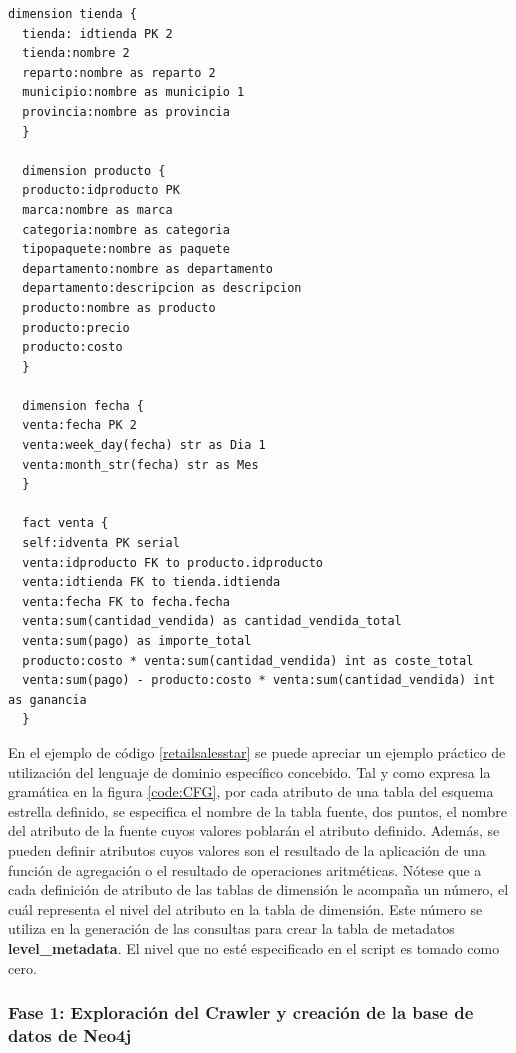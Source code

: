 \begin{lstlisting}[label={retailsalesstar}, caption={Definici\'on del esquema estrella del almacén de datos asociado al escenario ventas minoristas}]
  dimension tienda {
  tienda: idtienda PK 2
  tienda:nombre 2
  reparto:nombre as reparto 2
  municipio:nombre as municipio 1
  provincia:nombre as provincia 
  }

  dimension producto {
  producto:idproducto PK
  marca:nombre as marca
  categoria:nombre as categoria
  tipopaquete:nombre as paquete
  departamento:nombre as departamento
  departamento:descripcion as descripcion
  producto:nombre as producto
  producto:precio
  producto:costo
  }

  dimension fecha {
  venta:fecha PK 2
  venta:week_day(fecha) str as Dia 1
  venta:month_str(fecha) str as Mes 
  }

  fact venta {
  self:idventa PK serial
  venta:idproducto FK to producto.idproducto 
  venta:idtienda FK to tienda.idtienda
  venta:fecha FK to fecha.fecha
  venta:sum(cantidad_vendida) as cantidad_vendida_total
  venta:sum(pago) as importe_total
  producto:costo * venta:sum(cantidad_vendida) int as coste_total
  venta:sum(pago) - producto:costo * venta:sum(cantidad_vendida) int as ganancia 
  }
\end{lstlisting}

En el ejemplo de c\'odigo \ref{retailsalesstar} se puede apreciar un ejemplo pr\'actico de utilización 
del lenguaje de dominio espec\'ifico concebido. Tal y como expresa la gramática en la figura \ref{code:CFG}, 
por cada atributo de una tabla del esquema estrella definido, se especifica el nombre de la tabla 
fuente, dos puntos, el nombre del atributo de la fuente cuyos valores poblar\'an el atributo definido. 
Además, se pueden definir atributos cuyos valores son el resultado de la aplicación de una funci\'on de agregación 
o el resultado de operaciones aritméticas. Nótese que a cada definición de atributo de las tablas de 
dimensi\'on le acompaña un n\'umero, el 
cu\'al representa el nivel del atributo en la tabla de dimensi\'on. Este n\'umero 
se utiliza en la generación de las consultas para crear la tabla de metadatos \textbf{level\_metadata}. 
El nivel que no est\'e especificado en el script es tomado como cero. 

\subsubsection{Fase 1: Exploraci\'on del Crawler y creaci\'on de la base de datos de Neo4j}

